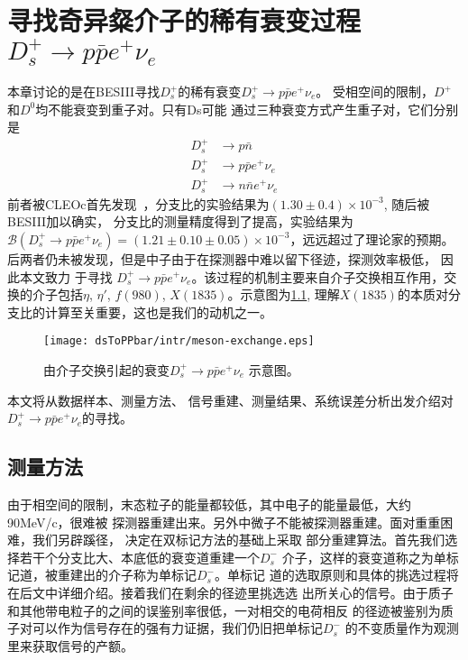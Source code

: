 ﻿%
%
%
\chapter{寻找奇异粲介子的稀有衰变过程$D_{s}^{+} \to p \bar{p} e^{+} \nu_{e}$}%
\label{cha:ds_ppbarenu}
本章讨论的是在BESIII寻找$D_{s}^{+}$的稀有衰变$D_{s}^{+} \to p \bar{p}
e^{+} \nu_{e}$。
受相空间的限制，$D^{+}$和$D^{0}$均不能衰变到重子对。只有Ds可能
通过三种衰变方式产生重子对，它们分别是
\begin{align}
    D_{s}^{+} &\to p \bar{n} \\
    D_{s}^{+} &\to p \bar{p} e^{+} \nu_{e} \\
    D_{s}^{+} &\to n \bar{n} e^{+} \nu_{e}
\end{align}
前者被CLEOc首先发现~\cite{Athar:2008ug}，分支比的实验结果为$(1.30 \pm
0.4)\times 10^{-3}$, 随后被BESIII加以确实\cite{Ablikim:2018iad}，
分支比的测量精度得到了提高，实验结果为
$\mathcal{B}(D_{s}^{+} \to p \bar{p} e^{+} \nu_e) = (1.21 \pm 0.10 \pm
0.05)\times 10^{-3}$，远远超过了理论家的预期。
后两者仍未被发现，但是中子由于在探测器中难以留下径迹，探测效率极低，
因此本文致力
于寻找 $ D_{s}^{+} \to p \bar{p} e^{+}
\nu_{e}$。该过程的机制主要来自介子交换相互作用，交换的介子包括$\eta$, $\eta
\prime$, $f(980)$,
$X(1835)$\cite{Cheng:2017qpv}。示意图为\ref{fig:meson-exchange},
理解$X(1835)$的本质对分支比的计算至关重要，这也是我们的动机之一。

\begin{figure}[htpb]
    \centering
    \texttt{[image: dsToPPbar/intr/meson-exchange.eps]}
    \caption{由介子交换引起的衰变$D_{s}^{+} \to p \bar{p} e^{+} \nu_{e}$
    示意图。}%
    \label{fig:meson-exchange}
\end{figure}
本文将从数据样本、测量方法、
信号重建、测量结果、系统误差分析出发介绍对
$D_{s}^{+} \to p \bar{p} e^{+} \nu_{e}$的寻找。

\section{测量方法}\label{sec:method}
由于相空间的限制，末态粒子的能量都较低，其中电子的能量最低，大约90MeV/c，很难被
探测器重建出来。另外中微子不能被探测器重建。面对重重困难，我们另辟蹊径，
决定在双标记方法的基础上采取
部分重建算法。首先我们选择若干个分支比大、本底低的衰变道重建一个$D_{s}^{-}$
介子，这样的衰变道称之为单标记道，被重建出的介子称为单标记$D_{s}^{-}$。单标记
道的选取原则和具体的挑选过程将在后文中详细介绍。接着我们在剩余的径迹里挑选选
出所关心的信号。由于质子和其他带电粒子的之间的误鉴别率很低，一对相交的电荷相反
的径迹被鉴别为质子对可以作为信号存在的强有力证据，我们仍旧把单标记$D_{s}^{-}$
的不变质量作为观测里来获取信号的产额。

